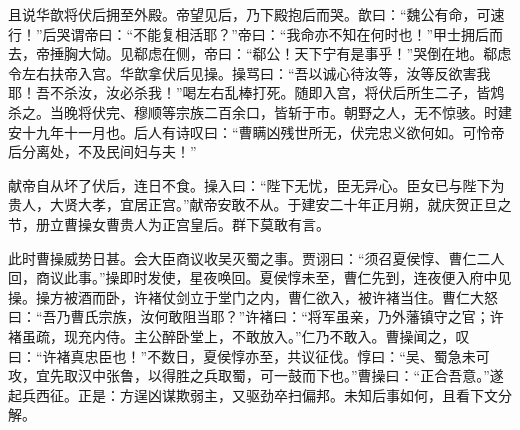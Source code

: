 且说华歆将伏后拥至外殿。帝望见后，乃下殿抱后而哭。歆曰：“魏公有命，可速行！”后哭谓帝曰：“不能复相活耶？”帝曰：“我命亦不知在何时也！”甲士拥后而去，帝捶胸大恸。见郗虑在侧，帝曰：“郗公！天下宁有是事乎！”哭倒在地。郗虑令左右扶帝入宫。华歆拿伏后见操。操骂曰：“吾以诚心待汝等，汝等反欲害我耶！吾不杀汝，汝必杀我！”喝左右乱棒打死。随即入宫，将伏后所生二子，皆鸩杀之。当晚将伏完、穆顺等宗族二百余口，皆斩于市。朝野之人，无不惊骇。时建安十九年十一月也。后人有诗叹曰：“曹瞒凶残世所无，伏完忠义欲何如。可怜帝后分离处，不及民间妇与夫！”

献帝自从坏了伏后，连日不食。操入曰：“陛下无忧，臣无异心。臣女已与陛下为贵人，大贤大孝，宜居正宫。”献帝安敢不从。于建安二十年正月朔，就庆贺正旦之节，册立曹操女曹贵人为正宫皇后。群下莫敢有言。

此时曹操威势日甚。会大臣商议收吴灭蜀之事。贾诩曰：“须召夏侯惇、曹仁二人回，商议此事。”操即时发使，星夜唤回。夏侯惇未至，曹仁先到，连夜便入府中见操。操方被酒而卧，许褚仗剑立于堂门之内，曹仁欲入，被许褚当住。曹仁大怒曰：“吾乃曹氏宗族，汝何敢阻当耶？”许褚曰：“将军虽亲，乃外藩镇守之官；许褚虽疏，现充内侍。主公醉卧堂上，不敢放入。”仁乃不敢入。曹操闻之，叹曰：“许褚真忠臣也！”不数日，夏侯惇亦至，共议征伐。惇曰：“吴、蜀急未可攻，宜先取汉中张鲁，以得胜之兵取蜀，可一鼓而下也。”曹操曰：“正合吾意。”遂起兵西征。正是：方逞凶谋欺弱主，又驱劲卒扫偏邦。未知后事如何，且看下文分解。